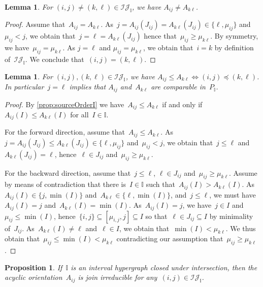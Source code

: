 \documentclass{amsart}
\newtheorem{proposition}[theorem]{Proposition}
\newtheorem{lemma}[theorem]{Lemma}
\theoremstyle{definition}
\newcommand{\cal}[1]{\mathcal{#1}} %
\newcommand{\II}{\mathbb I} %
\newcommand{\cIJ}{\cal{IJ}} %
\begin{document}
\pagebreak
\begin{lemma}
\label{lem:distinctIrreducibles2}
For $(i,j) \ne (k,\ell) \in \cIJ_\II$, we have $A_{ij} \ne A_{k\ell}$.
\end{lemma}

\begin{proof}
Assume that~$A_{ij} = A_{k\ell}$.
As~$j = A_{ij}(J_{ij}) = A_{k\ell}(J_{ij}) \in \{\ell, \mu_{ij}\}$ and~$\mu_{ij} < j$, we obtain that~$j = \ell = A_{k\ell}(J_{ij})$ hence that~$\mu_{ij} \ge \mu_{k\ell}$.
By symmetry, we have~$\mu_{ij} = \mu_{k\ell}$.
As $j = \ell$ and $\mu_{ij} = \mu_{k\ell}$, we obtain that~$i = k$ by definition of~$\cIJ_\II$.
We conclude that~$(i,j) = (k,\ell)$.
\end{proof}

\begin{lemma}
\label{lem:irrorder2}
For $(i,j), (k,\ell) \in \cIJ_\II$, we have $A_{ij} \le A_{k\ell} \iff (i,j) \preccurlyeq (k,\ell)$.
In particular~$j = \ell$ implies that $A_{ij}$ and~$A_{k\ell}$ are comparable in~$P_\II$.
\end{lemma}

\begin{proof}
By \cref{prop:sourceOrderI} we have~$A_{ij}\le A_{k\ell}$ if and only if~$A_{ij}(I) \le A_{k\ell}(I)$ for all~$I \in \II$.

For the forward direction, assume that~$A_{ij} \le A_{k\ell}$.
As~$j = A_{ij}(J_{ij}) \le A_{k\ell}(J_{ij}) \in \{\ell, \mu_{ij}\}$ and~$\mu_{ij} < j$, we obtain that~$j \le \ell$ and~$A_{k\ell}(J_{ij}) = \ell$, hence~$\ell \in J_{ij}$ and~$\mu_{ij} \ge \mu_{k\ell}$.

For the backward direction, assume that~$j \le \ell$, $\ell \in J_{ij}$ and~$\mu_{ij} \ge \mu_{k\ell}$.
Assume by means of contradiction that there is~$I \in \II$ such that~$A_{ij}(I) > A_{k\ell}(I)$.
As $A_{ij}(I) \in \{j, \min(I)\}$ and~$A_{k\ell} \in \{\ell, \min(I)\}$, and~$j \le \ell$, we must have~$A_{ij}(I) = j$ and~$A_{k\ell}(I) = \min(I)$.
As~$A_{ij}(I) = j$, we have~$j \in I$ and~$\mu_{ij} \le \min(I)$, hence~$\{i,j\} \subseteq [\mu_{i,j},j] \subseteq I$ so that~$\ell \in J_{ij} \subseteq I$ by minimality of~$J_{ij}$.
As~$A_{k\ell}(I) \ne \ell$ and~$\ell \in I$, we obtain that~$\min(I) < \mu_{k\ell}$.
We thus obtain that~$\mu_{ij} \le \min(I) < \mu_{k\ell}$ contradicting our assumption that~$\mu_{ij} \ge \mu_{k\ell}$.
\end{proof}

\begin{proposition}
\label{prop:AijJoinIrreducible}
If~$\II$ is an interval hypergraph closed under intersection, then the acyclic orientation~$A_{ij}$ is join irreducible for any~$(i,j) \in \cIJ_\II$.
\end{proposition}
\end{document}
